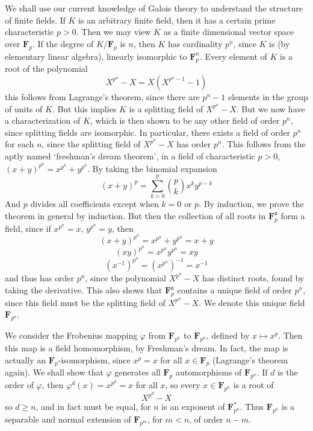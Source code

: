 We shall use our current knowledge of Galois theory to understand the structure of finite fields. If $K$ is an arbitrary finite field, then it has a certain prime characteristic $p > 0$. Then we may view $K$ as a finite dimensional vector space over $\mathbf{F}_p$. If the degree of $K/\mathbf{F}_p$ is $n$, then $K$ has cardinality $p^n$, since $K$ is (by elementary linear algebra), linearly isomorphic to $\mathbf{F}_p^n$. Every element of $K$ is a root of the polynomial
%
\[ X^{p^n} - X = X(X^{p^n - 1} - 1) \]
%
this follows from Lagrange's theorem, since there are $p^n - 1$ elements in the group of units of $K$. But this implies $K$ is a splitting field of $X^{p^n} - X$. But we now have a characterization of $K$, which is then shown to be any other field of order $p^n$, since splitting fields are isomorphic. In particular, there exists a field of order $p^n$ for each $n$, since the splitting field of $X^{p^n} - X$ has order $p^n$. This follows from the aptly named `freshman's dream theorem', in a field of characteristic $p > 0$, $(x + y)^{p^k} = x^{p^k} + y^{p^k}$. By taking the binomial expansion
%
\[ (x + y)^p = \sum_{k = 0}^{p} {p \choose k} x^k y^{p - k} \]
%
And $p$ divides all coefficients except when $k = 0$ or $p$. By induction, we prove the theorem in general by induction. But then the collection of all roots in $\mathbf{F}_p^{\mathfrak{a}}$ form a field, since if $x^{p^n} = x$, $y^{p^n} = y$, then
%
\[ (x + y)^{p^n} = x^{p^n} + y^{p^n} = x + y \]
%
\[ (xy)^{p^n} = x^{p^n} y^{p^n} = xy \]
%
\[ (x^{-1})^{p^n} = (x^{p^n})^{-1} = x^{-1} \]
%
and thus has order $p^n$, since the polynomial $X^{p^n} - X$ has distinct roots, found by taking the derivative. This also shows that $\mathbf{F}_p^{\mathfrak{a}}$ contains a unique field of order $p^n$, since this field must be the splitting field of $X^{p^n} - X$. We denote this unique field $\mathbf{F}_{p^n}$.

We consider the Frobenius mapping $\varphi$ from $\mathbf{F}_{p^n}$ to $\mathbf{F}_{p^n}$, defined by $x \mapsto x^p$. Then this map is a field homomorphism, by Freshman's dream. In fact, the map is actually an $\mathbf{F}_p$-isomorphism, since $x^p = x$ for all $x \in \mathbf{F}_p$ (Lagrange's theorem again). We shall show that $\varphi$ generates all $\mathbf{F}_p$ automorphisms of $\mathbf{F}_{p^n}$. If $d$ is the order of $\varphi$, then $\varphi^d(x) = x^{p^d} = x$ for all $x$, so every $x \in \mathbf{F}_{p^n}$ is a root of
%
\[ X^{p^d} - X \]
%
so $d \geq n$, and in fact must be equal, for $n$ is an exponent of $\mathbf{F}^*_{p^n}$. Thus $\mathbf{F}_{p^n}$ is a separable and normal extension of $\mathbf{F}_{p^m}$, for $m < n$, of order $n - m$.


